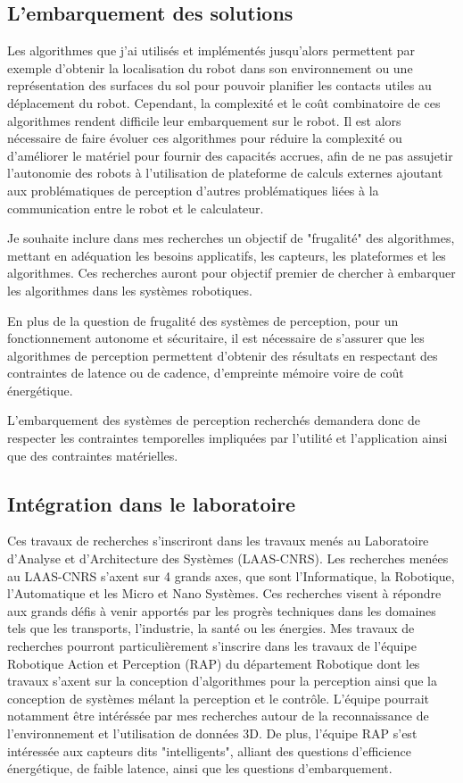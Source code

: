 \subsection{L'embarquement des solutions}

Les algorithmes que j'ai utilisés et implémentés jusqu'alors permettent par exemple d'obtenir la localisation du robot dans son environnement ou une représentation des surfaces du sol pour pouvoir planifier les contacts utiles au déplacement du robot. Cependant, la complexité et le coût combinatoire de ces algorithmes rendent difficile leur embarquement sur le robot. Il est alors nécessaire de faire évoluer ces algorithmes pour réduire la complexité ou d'améliorer le matériel pour fournir des capacités accrues, afin de ne pas assujetir l'autonomie des robots à l'utilisation de plateforme de calculs externes ajoutant aux problématiques de perception d'autres problématiques liées à la communication entre le robot et le calculateur.

Je souhaite inclure dans mes recherches un objectif de "frugalité" des algorithmes, mettant en adéquation les besoins applicatifs, les capteurs, les plateformes et les algorithmes. Ces recherches auront pour objectif premier de chercher à embarquer les algorithmes dans les systèmes robotiques.

En plus de la question de frugalité des systèmes de perception, pour un fonctionnement autonome et sécuritaire, il est nécessaire de s'assurer que les algorithmes de perception permettent d'obtenir des résultats en respectant des contraintes de latence ou de cadence, d'empreinte mémoire voire de coût énergétique.

L'embarquement des systèmes de perception recherchés demandera donc de respecter les contraintes temporelles impliquées par l'utilité et l'application ainsi que des contraintes matérielles.

\subsection{Intégration dans le laboratoire}

Ces travaux de recherches s'inscriront dans les travaux menés au Laboratoire d'Analyse et d'Architecture des Systèmes (LAAS-CNRS). Les recherches menées au LAAS-CNRS s'axent sur 4 grands axes, que sont l'Informatique, la Robotique, l'Automatique et les Micro et Nano Systèmes. Ces recherches visent à répondre aux grands défis à venir apportés par les progrès techniques dans les domaines tels que les transports, l'industrie, la santé ou les énergies. Mes travaux de recherches pourront particulièrement s'inscrire dans les travaux de l'équipe Robotique Action et Perception (RAP) du département Robotique dont les travaux s'axent sur la conception d'algorithmes pour la perception ainsi que la conception de systèmes mélant la perception et le contrôle. L'équipe pourrait notamment être intéréssée par mes recherches autour de la reconnaissance de l'environnement et l'utilisation de données 3D. De plus, l'équipe RAP s'est intéressée aux capteurs dits "intelligents", alliant des questions d'efficience énergétique, de faible latence, ainsi que les questions d'embarquement.

